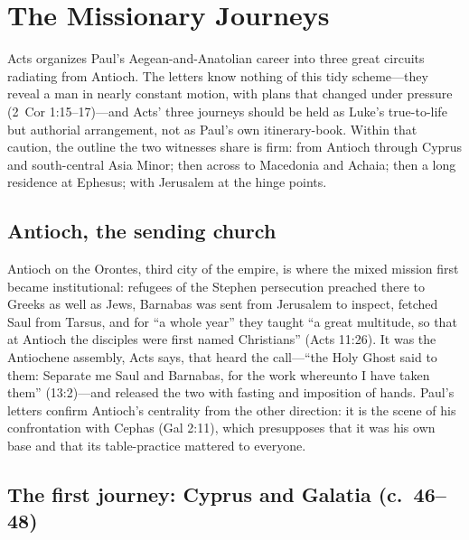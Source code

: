 \section{The Missionary Journeys}

Acts organizes Paul's Aegean-and-Anatolian career into three great
circuits radiating from Antioch. The letters know nothing of this tidy
scheme---they reveal a man in nearly constant motion, with plans that
changed under pressure (2~Cor 1:15--17)---and Acts' three journeys should
be held as Luke's true-to-life but authorial arrangement, not as Paul's
own itinerary-book. Within that caution, the outline the two witnesses
share is firm: from Antioch through Cyprus and south-central Asia Minor;
then across to Macedonia and Achaia; then a long residence at Ephesus;
with Jerusalem at the hinge points.

\subsection{Antioch, the sending church}

Antioch on the Orontes, third city of the empire, is where the mixed
mission first became institutional: refugees of the Stephen persecution
preached there to Greeks as well as Jews, Barnabas was sent from Jerusalem
to inspect, fetched Saul from Tarsus, and for ``a whole year'' they taught
``a great multitude, so that at Antioch the disciples were first named
Christians'' (Acts 11:26). It was the Antiochene assembly, Acts says, that
heard the call---``the Holy Ghost said to them: Separate me Saul and
Barnabas, for the work whereunto I have taken them'' (13:2)---and released
the two with fasting and imposition of hands. Paul's letters confirm
Antioch's centrality from the other direction: it is the scene of his
confrontation with Cephas (Gal 2:11), which presupposes that it was his
own base and that its table-practice mattered to everyone.

\subsection{The first journey: Cyprus and Galatia (c.~46--48)}

